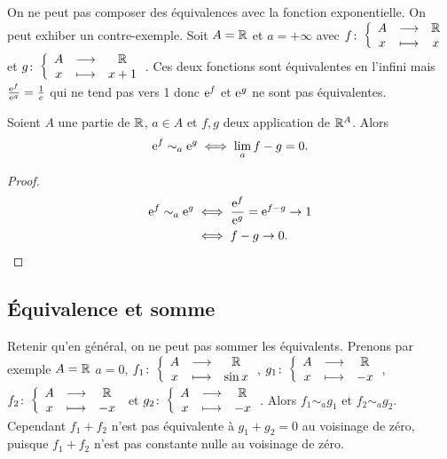 On ne peut pas composer des équivalences avec la fonction exponentielle. On peut
exhiber un contre-exemple. Soit \(A=\R\) et \(a=+\infty\) avec
\(\fonction{f}{A}{\R}{x}{x}\) et \(\fonction{g}{A}{\R}{x}{x+1}\). Ces deux
fonctions sont équivalentes en l'infini mais \(\frac{\e^{f}}{\e^{g}}
=\frac{1}{e}\) qui ne tend pas vers 1 donc \(\e^{f}\) et \(\e^{g}\) ne sont pas
équivalentes.

\begin{theo}
  Soient \(A\) une partie de \(\R\), \(a \in A\) et \(f, g\) deux application de
  \(\R^A\). Alors
  \begin{equation}
    \e^{f} \sim_a \e^{g} \iff \lim\limits_{a}f-g=0.
  \end{equation}
\end{theo}
\begin{proof}
  \begin{align}
    \e^{f} \sim_a \e^{g} &\iff \frac{\e^f}{\e^g} = \e^{f-g} \to 1 \\
    &\iff f-g \to 0.
  \end{align}
\end{proof}

\subsection{Équivalence et somme}

Retenir qu'en général, on ne peut pas sommer les équivalents. Prenons par
exemple \(A=\R\) \(a=0\), \(\fonction{f_1}{A}{\R}{x}{\sin x}\),
\(\fonction{g_1}{A}{\R}{x}{-x}\), \(\fonction{f_2}{A}{\R}{x}{-x}\) et
\(\fonction{g_2}{A}{\R}{x}{-x}\). Alors \(f_1 \sim_a g_1\) et \(f_2 \sim_a
g_2\). Cependant \(f_1+f_2\) n'est pas équivalente à \(g_1+g_2=0\) au voisinage
de zéro, puisque \(f_1+f_2\) n'est pas constante nulle au voisinage de zéro.

